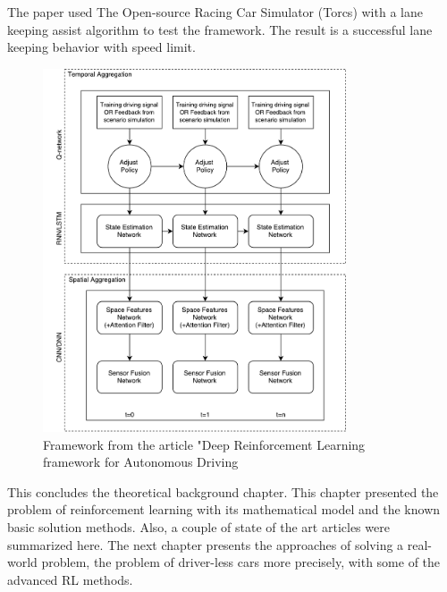 The paper used The Open-source Racing Car Simulator (Torcs) with a lane keeping assist algorithm to test the framework. The result is a successful lane keeping behavior with speed limit.        

\begin{figure}[H]
	\centering
	\includegraphics[width=0.8\textwidth]{Figures/TheoreticalBackground/Framework_article}
	\caption{Framework from the article "Deep Reinforcement Learning framework for Autonomous Driving}
	\label{fig:Framework_article}
\end{figure}
 
This concludes the theoretical background chapter. This chapter presented the problem of reinforcement learning with its mathematical model and the known basic solution methods. Also, a couple of state of the art articles were summarized here. The next chapter presents the approaches of solving a real-world problem, the problem of driver-less cars more precisely, with some of the advanced RL methods.